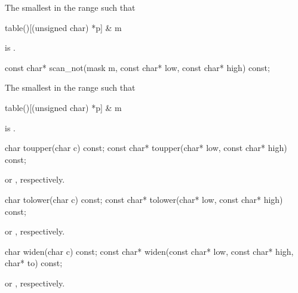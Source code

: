 \begin{itemdescr}
\pnum
\returns
The smallest
in the range
such that
\begin{codeblock}
table()[(unsigned char) *p] & m
\end{codeblock}
is
.
\end{itemdescr}

%
\begin{itemdecl}
const char* scan_not(mask m, const char* low, const char* high) const;
\end{itemdecl}

\begin{itemdescr}
\pnum
\returns
The smallest
in the range
such that
\begin{codeblock}
table()[(unsigned char) *p] & m
\end{codeblock}
is
.
\end{itemdescr}

%
\begin{itemdecl}
char        toupper(char c) const;
const char* toupper(char* low, const char* high) const;
\end{itemdecl}

\begin{itemdescr}
\pnum
\returns
{}
or
,
respectively.
\end{itemdescr}

%
\begin{itemdecl}
char        tolower(char c) const;
const char* tolower(char* low, const char* high) const;
\end{itemdecl}

\begin{itemdescr}
\pnum
\returns
{}
or
,
respectively.
\end{itemdescr}

%
\begin{itemdecl}
char  widen(char c) const;
const char* widen(const char* low, const char* high, char* to) const;
\end{itemdecl}

\begin{itemdescr}
\pnum
\returns
{}
or
%
,
respectively.
\end{itemdescr}

